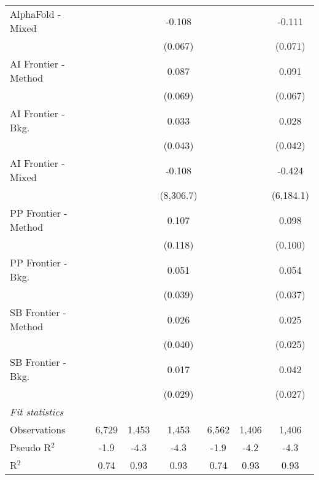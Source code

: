 \begin{tabular}{lcccccc}
   AlphaFold - Mixed    &              &             & -0.108    &              &             & -0.111\\   
                        &              &             & (0.067)   &              &             & (0.071)\\   
   AI Frontier - Method &              &             & 0.087     &              &             & 0.091\\   
                        &              &             & (0.069)   &              &             & (0.067)\\   
   AI Frontier - Bkg.   &              &             & 0.033     &              &             & 0.028\\   
                        &              &             & (0.043)   &              &             & (0.042)\\   
   AI Frontier - Mixed  &              &             & -0.108    &              &             & -0.424\\   
                        &              &             & (8,306.7) &              &             & (6,184.1)\\   
   PP Frontier - Method &              &             & 0.107     &              &             & 0.098\\   
                        &              &             & (0.118)   &              &             & (0.100)\\   
   PP Frontier - Bkg.   &              &             & 0.051     &              &             & 0.054\\   
                        &              &             & (0.039)   &              &             & (0.037)\\   
   SB Frontier - Method &              &             & 0.026     &              &             & 0.025\\   
                        &              &             & (0.040)   &              &             & (0.025)\\   
   SB Frontier - Bkg.   &              &             & 0.017     &              &             & 0.042\\   
                        &              &             & (0.029)   &              &             & (0.027)\\   
   \midrule
   \emph{Fit statistics}\\
   Observations         & 6,729        & 1,453       & 1,453     & 6,562        & 1,406       & 1,406\\  
   Pseudo R$^2$         & -1.9         & -4.3        & -4.3      & -1.9         & -4.2        & -4.3\\  
   R$^2$                & 0.74         & 0.93        & 0.93      & 0.74         & 0.93        & 0.93\\  
   

\end{tabular}
